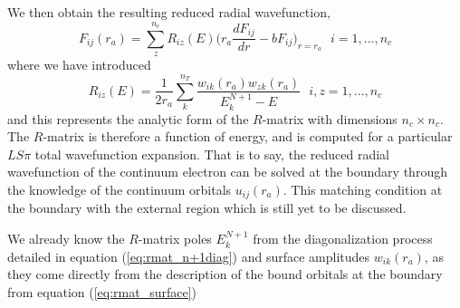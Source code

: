  We then obtain the resulting reduced radial wavefunction,
\begin{equation}\label{eq:rmat_rrw2}
F_{ij}(r_a)=\sum_z^{n_c}R_{iz}(E)\Big(r_a\frac{dF_{ij}}{dr}-bF_{ij}\Big)_{r=r_a} ~~~ i=1,...,n_c
\end{equation}
where we have introduced
\begin{equation}\label{eq:rmat_rmatrix}
R_{iz}(E)=\frac{1}{2r_a}\sum_k^{n_T}\frac{w_{ik}(r_a)w_{zk}(r_a)}{E_k^{N+1}-E} ~~~ i,z=1,...,n_c \end{equation}
and this represents the analytic form of the $R$-matrix with dimensions $n_c\times n_c$. The $R$-matrix is therefore a function of energy, and is computed for a particular $LS\pi$ total wavefunction expansion. That is to say, the reduced radial wavefunction of the continuum electron can be solved at the boundary through the knowledge of the continuum orbitals $u_{ij}(r_a)$. This matching condition at the boundary with the external region which is still yet to be discussed.

We already know the $R$-matrix poles $E_k^{N+1}$ from the diagonalization process detailed in equation (\ref{eq:rmat_n+1diag}) and surface amplitudes $w_{ik}(r_a)$, as they come directly from the description of the bound orbitals at the boundary from equation (\ref{eq:rmat_surface})

